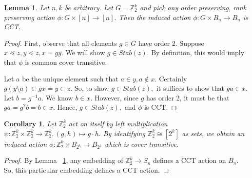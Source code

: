 \documentclass[10 pt]{amsart}
\theoremstyle{plain}
\newtheorem{lem}[thm]{Lemma}
\newtheorem{cor}[thm]{Corollary}
\theoremstyle{definition}
\theoremstyle{remark}
\numberwithin{equation}{section}
\newcommand\BBZ{{\mathbb Z}}
\begin{document}
\begin{lem}
\label{lem:order_2_CCT}
Let $n,k$ be arbitrary. Let $G = \BBZ_2^k$ and pick any order preserving, rank preserving action $\phi:G\times [n] \rightarrow [n].$ Then the induced action $\phi:G \times B_n \rightarrow B_n$ is CCT.
\end{lem}
\begin{proof}
First, observe that all elements $g \in G$ have order 2. Suppose $x \lessdot z, y \lessdot z, x = gy.$ We will show $g \in Stab(z).$ By definition, this would imply that $\phi$ is common cover transitive. 

Let $a$ be the unique element such that $a \in y, a \notin x.$ Certainly $g(y\setminus a) \subset gx=y \subset z.$ So, to show $g \in Stab(z),$ it suffices to show that $ga \in x.$ Let $b = g^{-1}a.$ We know $b \in x.$ However, since $g$ has order 2, it must be that $ga = g^2 b = b \in x.$ Hence, $g \in Stab(z),$ and $\phi$ is CCT.
\end{proof}

\begin{cor}
\label{cor:regular_order_2_CCT}
Let $\BBZ_2^k$ act on itself by left multiplication $\psi:\BBZ_2^k \times \BBZ_2^k \rightarrow \BBZ_2^k,(g,h) \mapsto g\cdot h.$ By identifying $\BBZ_2^k \cong [2^k]$ as sets, we obtain an induced action $\phi:\BBZ_2^k \times B_{2^k} \rightarrow B_{2^k}$ which is cover transitive.
\end{cor}
\begin{proof}
By Lemma ~\ref{lem:order_2_CCT}, any embedding of $\BBZ_2^k \rightarrow S_n$ defines a CCT action on $B_n.$ So, this particular embedding defines a CCT action.
\end{proof}
\end{document}
